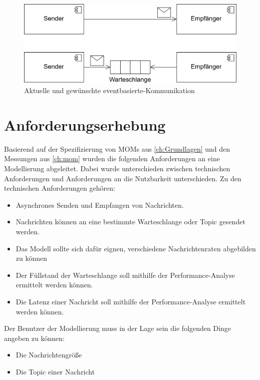 \begin{figure}
\center
  \includegraphics[width=1\textwidth]{images/modelling/oldEventBased.png}
  \caption{Aktuelle und gewünschte eventbasierte-Kommunikation}
  \label{img:oldEventBased}
\end{figure}


\section{Anforderungserhebung}
\label{sec:anforderungserhebung}
Basierend auf der Spezifizierung von MOMs aus \autoref{ch:Grundlagen} und den Messungen aus \autoref{ch:mom} wurden die folgenden Anforderungen an eine Modellierung abgeleitet. Dabei wurde unterschieden zwischen technischen Anforderungen und Anforderungen an die Nutzbarkeit unterschieden. 
Zu den technischen Anforderungen gehören:
\begin{itemize}
    \item Asynchrones Senden und Empfangen von Nachrichten.
    \item Nachrichten können an eine bestimmte Warteschlange oder Topic gesendet werden.
    \item Das Modell sollte sich dafür eignen, verschiedene Nachrichtenraten abgebilden zu können
    \item Der Füllstand der Warteschlange soll mithilfe der Performance-Analyse ermittelt werden können.
    \item Die Latenz einer Nachricht soll mithilfe der Performance-Analyse ermittelt werden können.
\end{itemize}
Der Benutzer der Modellierung muss in der Lage sein die folgenden Dinge angeben zu können:
\begin{itemize}
    \item Die Nachrichtengröße
    \item Die Topic einer Nachricht
\end{itemize}


